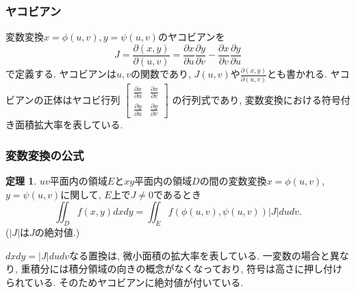 \documentclass[dvipdfmx,cjk,10.2pt]{beamer}
\theoremstyle{definition}
\newtheorem{Thm}{定理}[section]
\begin{document}


\begin{frame}
\frametitle{ヤコビアン}

変数変換$x=\phi(u,v), y=\psi(u,v)$のヤコビアンを
$$
J
=\frac{\partial(x,y)}{\partial(u,v)}=\frac{\partial x}{\partial u}\frac{\partial y}{\partial v}-\frac{\partial x}{\partial v}\frac{\partial y}{\partial u}
$$
で定義する. 
ヤコビアンは$u,v$の関数であり, $J(u,v)$や$\frac{\partial(x,y)}{\partial(u,v)}$とも書かれる. 
ヤコビアンの正体はヤコビ行列
$\begin{bmatrix}\frac{\partial x}{\partial u} & \frac{\partial x}{\partial v} \\ \frac{\partial y}{\partial u} &\frac{\partial y}{\partial v} \end{bmatrix}$
の行列式であり, 変数変換における符号付き面積拡大率を表している. 

\end{frame}




\begin{frame}
\frametitle{変数変換の公式}


\begin{Thm} \label{二重積分_変換公式}
$uv$平面内の領域$E$と$xy$平面内の領域$D$の間の変数変換$x=\phi(u,v)$, $y=\psi(u,v)$に関して, $E$上で$J\ne0$であるとき
$$
\iint_D f(x,y)dxdy = \iint_E f(\phi(u,v),\psi(u,v))|J|dudv. 
$$
($|J|$は$J$の絶対値.) 
\end{Thm}
$dxdy=|J|dudv$なる置換は, 微小面積の拡大率を表している. 
一変数の場合と異なり, 重積分には積分領域の向きの概念がなくなっており, 符号は高さに押し付けられている. 
そのためヤコビアンに絶対値が付いている.  

\end{frame}



\end{document}
